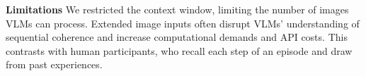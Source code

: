 
\textbf{Limitations}\hspace{.3cm} We restricted the context window, limiting the number of images VLMs can process. Extended image inputs often disrupt VLMs' understanding of sequential coherence and increase computational demands and API costs. This contrasts with human participants, who recall each step of an episode and draw from past experiences.